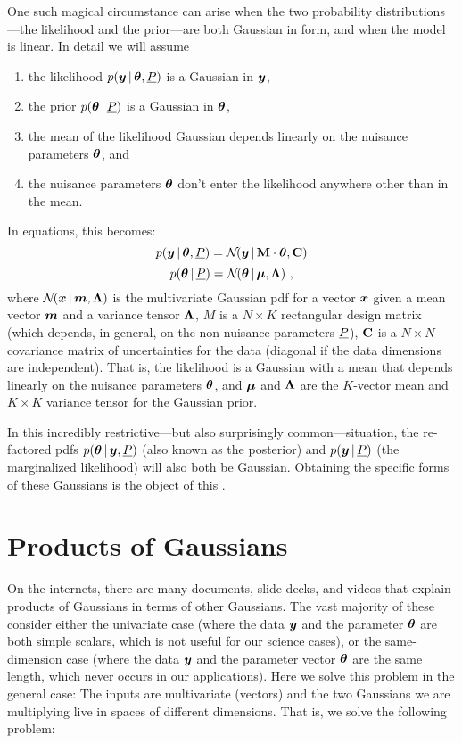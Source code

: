 One such magical circumstance can arise when the two probability
distributions---the likelihood and the prior---are both Gaussian in
form, and when the model is linear.
In detail we will assume
\begin{enumerate}
\item
the likelihood $p(\boldsymbol{y}\,|\,\boldsymbol{\theta},\underline{P})$ is a Gaussian in $\boldsymbol{y}$,
\item
the prior $p(\boldsymbol{\theta}\,|\,\underline{P})$ is a Gaussian in $\boldsymbol{\theta}$,
\item
the mean of the likelihood Gaussian depends linearly on the nuisance
parameters $\boldsymbol{\theta}$, and
\item
the nuisance parameters $\boldsymbol{\theta}$ don't enter the likelihood anywhere
other than in the mean.
\end{enumerate}
In equations, this becomes:
\begin{equation}
p(\boldsymbol{y}\,|\,\boldsymbol{\theta},\underline{P}) = \mathcal{N}\!(\boldsymbol{y}\,|\,\mathbf{M}\cdot\boldsymbol{\theta},\mathbf{C})
\end{equation}
\begin{equation}
p(\boldsymbol{\theta}\,|\,\underline{P}) = \mathcal{N}\!(\boldsymbol{\theta}\,|\,\boldsymbol{\mu},\mathbf{\Lambda})
~ ,
\end{equation}
where
$\mathcal{N}\!(\boldsymbol{x}\,|\,\boldsymbol{m},\mathbf{\Lambda})$ is the multivariate Gaussian pdf for a vector $\boldsymbol{x}$
given a mean vector $\boldsymbol{m}$ and a variance tensor $\mathbf{\Lambda}$,
$M$ is a $N\times K$ rectangular design matrix (which depends, in
general, on the non-nuisance parameters $\underline{P}$),
$\mathbf{C}$ is a $N\times N$ covariance matrix of uncertainties for the
data (diagonal if the data dimensions are independent).
That is, the likelihood is a Gaussian with a mean that depends
linearly on the nuisance parameters $\boldsymbol{\theta}$, and
$\boldsymbol{\mu}$ and $\mathbf{\Lambda}$ are the $K$-vector mean and $K\times K$ variance tensor
for the Gaussian prior.

In this incredibly restrictive---but also surprisingly
common---situation, the re-factored pdfs $p(\boldsymbol{\theta}\,|\,\boldsymbol{y},\underline{P})$ (also
known as the posterior) and $p(\boldsymbol{y}\,|\,\underline{P})$ (the marginalized
likelihood) will also both be Gaussian.
Obtaining the specific forms of these Gaussians is the object of this
\documentname.

\section{Products of Gaussians}

On the internets, there are many documents, slide decks, and videos
that explain products of Gaussians in terms of other Gaussians.
The vast majority of these consider either the univariate case (where
the data $\boldsymbol{y}$ and the parameter $\boldsymbol{\theta}$ are both simple scalars, which
is not useful for our science cases), or the same-dimension case (where the data
$\boldsymbol{y}$ and the parameter vector $\boldsymbol{\theta}$ are the same length, which never
occurs in our applications).
Here we solve this problem in the general case:
The inputs are multivariate (vectors) and the two Gaussians we are
multiplying live in spaces of different dimensions.
That is, we solve the following problem:

